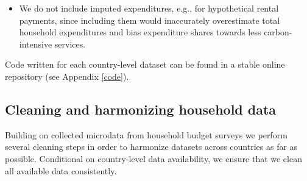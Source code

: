 \documentclass[12pt, a4paper]{article}
\begin{document}
\begin{refsection}
\begin{itemize}
    \item We do not include imputed expenditures, e.g., for hypothetical rental payments, since including them would inaccurately overestimate total household expenditures and bias expenditure shares towards less carbon-intensive services.
\end{itemize}

Code written for each country-level dataset can be found in a stable online repository (see Appendix \ref{code}).

\subsection{Cleaning and harmonizing household data}\label{sec:cleaning_2}

Building on collected microdata from household budget surveys we perform several cleaning steps in order to harmonize datasets across countries as far as possible. Conditional on country-level data availability, we ensure that we clean all available data consistently. 


\end{refsection}
\end{document}
